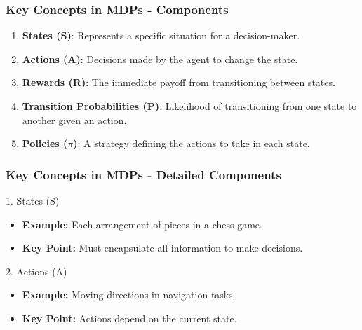 \documentclass[aspectratio=169]{beamer}
\begin{document}
\begin{frame}[fragile]
    \frametitle{Key Concepts in MDPs - Components}
    \begin{enumerate}
        \item \textbf{States (S)}: Represents a specific situation for a decision-maker.
        \item \textbf{Actions (A)}: Decisions made by the agent to change the state.
        \item \textbf{Rewards (R)}: The immediate payoff from transitioning between states.
        \item \textbf{Transition Probabilities (P)}: Likelihood of transitioning from one state to another given an action.
        \item \textbf{Policies ($\pi$)}: A strategy defining the actions to take in each state.
    \end{enumerate}
\end{frame}

\begin{frame}[fragile]
    \frametitle{Key Concepts in MDPs - Detailed Components}
    \begin{block}{1. States (S)}
        \begin{itemize}
            \item \textbf{Example:} Each arrangement of pieces in a chess game.
            \item \textbf{Key Point:} Must encapsulate all information to make decisions.
        \end{itemize}
    \end{block}

    \begin{block}{2. Actions (A)}
        \begin{itemize}
            \item \textbf{Example:} Moving directions in navigation tasks.
            \item \textbf{Key Point:} Actions depend on the current state.
        \end{itemize}
    \end{block}
\end{frame}
\end{document}
